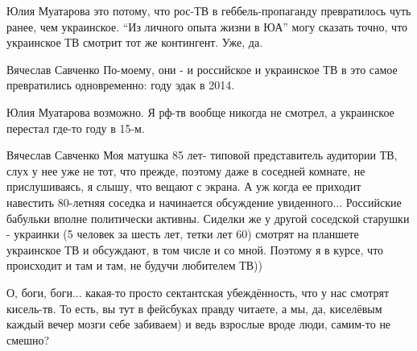 \begin{itemize}

Юлия Муатарова это потому, что рос-ТВ в геббель-пропаганду превратилось чуть
ранее, чем украинское.  \enquote{Из личного опыта жизни в ЮА} могу сказать
точно, что украинское ТВ смотрит тот же контингент. Уже, да.


Вячеслав Савченко По-моему, они - и российское и украинское ТВ в это самое
превратились одновременно: году эдак в 2014.


Юлия Муатарова возможно. Я рф-тв вообще никогда не смотрел, а украинское
перестал где-то году в 15-м.


Вячеслав Савченко Моя матушка 85 лет- типовой представитель аудитории ТВ, слух
у нее уже не тот, что прежде, поэтому даже в соседней комнате, не
прислушиваясь, я слышу, что вещают с экрана. А уж когда ее приходит навестить
80-летняя соседка и начинается обсуждение увиденного... Российские бабульки
вполне политически активны. Сиделки же у другой соседской старушки - украинки
(5 человек за шесть лет, тетки лет 60) смотрят на планшете украинское ТВ и
обсуждают, в том числе и со мной. Поэтому я в курсе, что происходит и там и
там, не будучи любителем ТВ))


О, боги, боги... какая-то просто сектантская убеждённость, что у нас смотрят
кисель-тв. То есть, вы тут в фейсбуках правду читаете, а мы, да, киселёвым
каждый вечер мозги себе забиваем) и ведь взрослые вроде люди, самим-то не
смешно?

\end{itemize}
